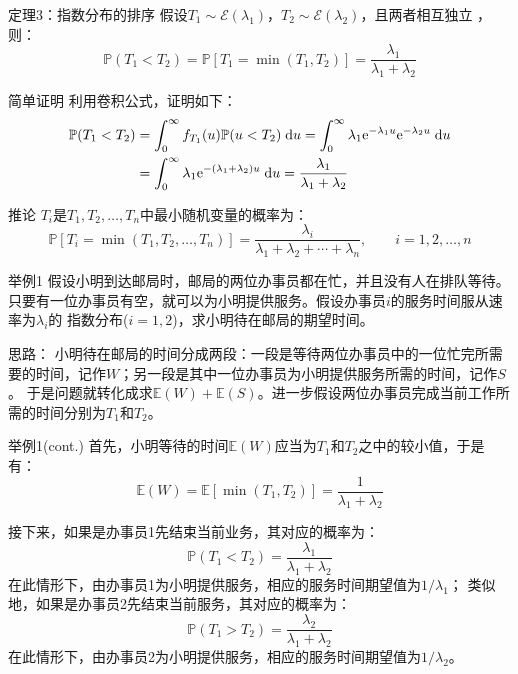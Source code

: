 \documentclass[t]{beamer}
\newcommand{\dif}{{\;\rm d}}
\renewcommand{\Pr}{\mathbb{P}}
\newcommand{\E}{\mathbb{E}}
\begin{document}
\begin{frame}{定理3：指数分布的排序}
    \small
    假设$T_1\sim \mathcal{E}(\lambda_1)$，$T_2\sim \mathcal{E}(\lambda_2)$，且两者相互独立 ，则：
    \begin{equation*}
    \Pr(T_1<T_2)=\Pr[T_1=\min(T_1,T_2)]=\frac{\lambda_1}{\lambda_1+\lambda_2}
\end{equation*}

\begin{block}{简单证明}
        利用卷积公式，证明如下：
\[\begin{split}
\Pr(T_1<T_2)&=\int^{\infty}_0 f_{T_1}(u)\Pr(u<T_2)\dif u
=\int^{\infty}_0 \lambda_1{\rm e}^{-\lambda_1 u}{\rm e}^{-\lambda_2 u}\dif u\\
&=\int^{\infty}_0 \lambda_1 {\rm e}^{-(\lambda_1+\lambda_2)u}\dif u=\frac{\lambda_1}{\lambda_1+\lambda_2}
\end{split}\]
        \end{block}
\end{frame}


\begin{frame}{推论}
    $T_i$是$T_1,T_2,\ldots,T_n$中最小随机变量的概率为：
	\begin{equation*}
	\Pr[T_i=\min(T_1,T_2,\ldots,T_n)]=\frac{\lambda_i}{\lambda_1+\lambda_2+\cdots+\lambda_n},\qquad i=1,2,\ldots,n
	\end{equation*} 

    
\end{frame}


\begin{frame}{举例1}
    假设小明到达邮局时，邮局的两位办事员都在忙，并且没有人在排队等待。只要有一位办事员有空，就可以为小明提供服务。假设办事员$i$的服务时间服从速率为$\lambda_i$的
指数分布($i=1,2$)，求小明待在邮局的期望时间。

\begin{block}{思路：}
    小明待在邮局的时间分成两段：一段是等待两位办事员中的一位忙完所需要的时间，记作$W$；另一段是其中一位办事员为小明提供服务所需的时间，记作$S$。
于是问题就转化成求$\E(W)+\E(S)$。进一步假设两位办事员完成当前工作所需的时间分别为$T_1$和$T_2$。
\end{block}
\end{frame}


\begin{frame}{举例1(cont.)}
    首先，小明等待的时间$\E(W)$应当为$T_1$和$T_2$之中的较小值，于是有：
\[\E(W)=\E[\min(T_1,T_2)]=\frac{1}{\lambda_1+\lambda_2} \]

接下来，如果是办事员1先结束当前业务，其对应的概率为：
\[\Pr(T_1<T_2)=\frac{\lambda_1}{\lambda_1+\lambda_2} \]
在此情形下，由办事员1为小明提供服务，相应的服务时间期望值为$1/\lambda_1$；
类似地，如果是办事员2先结束当前服务，其对应的概率为：
\[\Pr(T_1>T_2)=\frac{\lambda_2}{\lambda_1+\lambda_2} \]
在此情形下，由办事员2为小明提供服务，相应的服务时间期望值为$1/\lambda_2$。
\end{frame}
\end{document}
